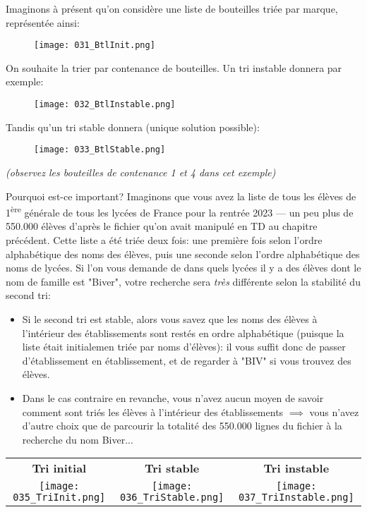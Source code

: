 \documentclass[12pt]{article}
\begin{document}
	Imaginons à présent qu'on considère une liste de bouteilles triée par marque, représentée ainsi:
	\begin{figure}[H]
		\centering
		\texttt{[image: 031\_BtlInit.png]}
	\end{figure}
	
	On souhaite la trier par contenance de bouteilles. Un tri instable donnera par exemple:
	\begin{figure}[H]
		\centering
		\texttt{[image: 032\_BtlInstable.png]}
	\end{figure}
	
	Tandis qu'un tri stable donnera (unique solution possible):
	\begin{figure}[H]
		\centering
		\texttt{[image: 033\_BtlStable.png]}
	\end{figure}
	
	\textit{(observez les bouteilles de contenance 1 et 4 dans cet exemple)}
	
	Pourquoi est-ce important? Imaginons que vous avez la liste de tous les élèves de 1\textsuperscript{ère} générale de tous les lycées de France pour la rentrée 2023 --- un peu plus de 550.000 élèves d'après le fichier qu'on avait manipulé en TD au chapitre précédent. Cette liste a été triée deux fois: une première fois selon l'ordre alphabétique des noms des élèves, puis une seconde selon l'ordre alphabétique des noms de lycées. Si l'on vous demande de dans quels lycées il y a des élèves dont le nom de famille est "Biver", votre recherche sera \textit{très} différente selon la stabilité du second tri:
	\begin{itemize}
		\item Si le second tri est stable, alors vous savez que les noms des élèves à l'intérieur des établissements sont restés en ordre alphabétique (puisque la liste était initialemen triée par noms d'élèves): il vous suffit donc de passer d'établissement en établissement, et de regarder à "BIV" si vous trouvez des élèves.
		\item Dans le cas contraire en revanche, vous n'avez aucun moyen de savoir comment sont triés les élèves à l'intérieur des établissements $\implies$ vous n'avez d'autre choix que de parcourir la totalité des 550.000 lignes du fichier à la recherche du nom Biver...
	\end{itemize}
	
	\begin{center}
		\begin{tabular}{c c c}
			\textbf{Tri initial} & \textbf{Tri stable} & \textbf{Tri instable} \\
			\texttt{[image: 035\_TriInit.png]} & \texttt{[image: 036\_TriStable.png]}  &
			\texttt{[image: 037\_TriInstable.png]}
		\end{tabular}
	\end{center}
	
\end{document}
